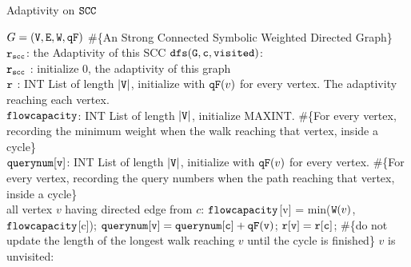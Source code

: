     \begin{algorithm}
            \caption{
            {Adaptivity on $\mathtt{SCC}$}
            \label{alg:dfscycle_alg}
            }
            \begin{algorithmic}[1]
              \REQUIRE $G = (\mathtt{V}, \mathtt{E}, \mathtt{W}, \mathtt{qF})$ \#\{An Strong Connected Symbolic Weighted Directed Graph\}
            \\
            $\mathtt{r_{scc}}$: the Adaptivity of this SCC
             {$\mathtt{dfs(G, c,visited)}$}:
            \STATE {} 
            \\ \qquad  $\mathtt{r_{scc}}$ : initialize $0$, the adaptivity of this graph
            \\ \qquad  $\mathtt{r}$ : INT List of length $|\mathtt{V}|$, initialize with $\mathtt{qF}(v)$ for every vertex. The adaptivity reaching each vertex.
            \\ \qquad  $\mathtt{flowcapacity}$: INT List of length $|\mathtt{V}|$, initialize MAXINT. 
            \#\{For every vertex, recording the minimum weight when the walk reaching 
            that vertex, inside a cycle\}
            \\ \qquad  $\mathtt{querynum[v]}$: INT List of length $|\mathtt{V}|$, initialize with $\mathtt{qF}(v)$ for every vertex. 
            \#\{For every vertex, recording the query numbers when the path reaching 
            that vertex, inside a cycle\}
            \\
            \STATE {}  all vertex $v$ having directed edge from $c$:
            \STATE \qquad \qquad \qquad $\mathtt{flowcapacity}$[v] = min($\mathtt{W}(v)$, $\mathtt{flowcapacity}$[c]);
            \STATE \qquad \qquad \qquad $\mathtt{querynum[v] = querynum[c] + \mathtt{qF}(v)}$;
            \STATE \qquad \qquad \qquad $\mathtt{r[v] =  r[c]} $; \#\{do not update the length of the longest walk reaching $v$ until the cycle is finished\}
            \STATE \qquad {}  $v$ is unvisited:

\end{algorithmic}
\end{algorithm}
